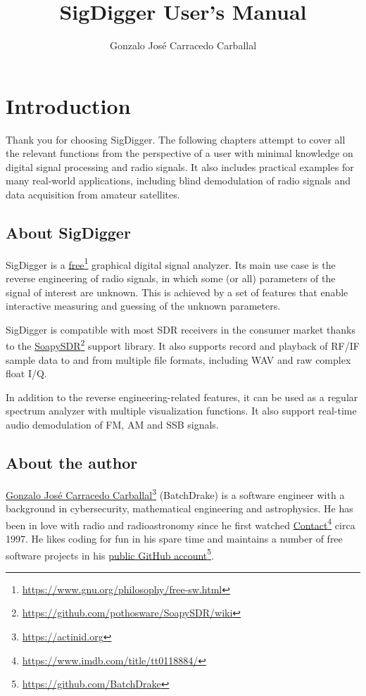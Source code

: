 \documentclass{ol-softwaremanual}
\title{SigDigger User's Manual}
\author{Gonzalo José Carracedo Carballal}
\newcommand{\doclink}[2]{\href{#1}{#2}\footnote{\url{#1}}}
\begin{document}
\setcounter{secnumdepth}{0}
\maketitle

\tableofcontents

\setlength{\parindent}{0pt}
\setlength{\parskip}{.5\baselineskip}

\chapter{Introduction}
\selectfont
Thank you for choosing SigDigger. The following chapters attempt to cover all the relevant functions from the perspective of a user with minimal knowledge on digital signal processing and radio signals. It also includes practical examples for many real-world applications, including blind demodulation of radio signals and data acquisition from amateur satellites. 

\section{About SigDigger}
SigDigger is a \doclink{https://www.gnu.org/philosophy/free-sw.html}{free} graphical digital signal analyzer. Its main use case is the reverse engineering of radio signals, in which some (or all) parameters of the signal of interest are unknown. This is achieved by a set of features that enable interactive measuring and guessing of the unknown parameters.

SigDigger is compatible with most SDR receivers in the consumer market thanks to the \doclink{https://github.com/pothosware/SoapySDR/wiki}{SoapySDR} support library. It also supports record and playback of RF/IF sample data to and from multiple file formats, including WAV and raw complex float I/Q.

In addition to the reverse engineering-related features, it can be used as a regular spectrum analyzer with multiple visualization functions. It also support real-time audio demodulation of FM, AM and SSB signals.

\section{About the author}
\doclink{https://actinid.org}{Gonzalo José Carracedo Carballal} (BatchDrake) is a software engineer with a background in cybersecurity, mathematical engineering and astrophysics. He has been in love with radio and radioastronomy since he first watched \doclink{https://www.imdb.com/title/tt0118884/}{Contact} circa 1997. He likes coding for fun in his spare time and maintains a number of free software projects in his \doclink{https://github.com/BatchDrake}{public GitHub account}.
\end{document}
